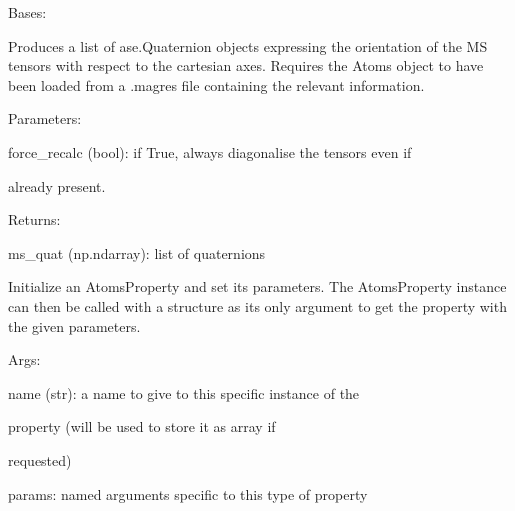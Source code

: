 \documentclass[letterpaper,10pt,english]{sphinxmanual}
\begin{document}
\begin{fulllineitems}
\label{doctree/soprano.properties.nmr.ms:soprano.properties.nmr.ms.MSQuaternion}
Bases: {\hyperref[doctree/soprano.properties.atomsproperty:soprano.properties.atomsproperty.AtomsProperty]{}}

Produces a list of ase.Quaternion objects expressing the orientation of
the MS tensors with respect to the cartesian axes.
Requires the Atoms object to have been loaded from a .magres file
containing the relevant information.

\begin{DUlineblock}{0em}
\item[] Parameters:
\item[]
\begin{DUlineblock}{\DUlineblockindent}
\item[] force\_recalc (bool): if True, always diagonalise the tensors even if
\item[]
\begin{DUlineblock}{\DUlineblockindent}
\item[] already present.
\end{DUlineblock}
\end{DUlineblock}
\end{DUlineblock}

\begin{DUlineblock}{0em}
\item[] Returns:
\item[]
\begin{DUlineblock}{\DUlineblockindent}
\item[] ms\_quat (np.ndarray): list of quaternions
\end{DUlineblock}
\end{DUlineblock}

Initialize an AtomsProperty and set its parameters.
The AtomsProperty instance can then be called with a structure as its
only argument to get the property with the given parameters.

\begin{DUlineblock}{0em}
\item[] Args:
\item[]
\begin{DUlineblock}{\DUlineblockindent}
\item[] name (str): a name to give to this specific instance of the
\item[]
\begin{DUlineblock}{\DUlineblockindent}
\item[] property (will be used to store it as array if
\item[] requested)
\end{DUlineblock}
\item[] params: named arguments specific to this type of property
\end{DUlineblock}
\end{DUlineblock}


\end{fulllineitems}
\end{document}
